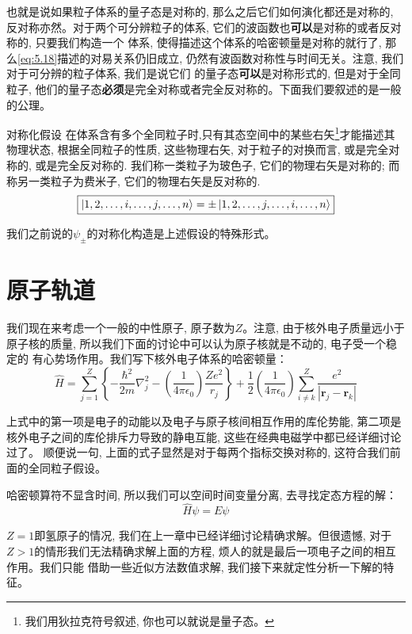 \documentclass[a4paper,zihao=-4,linespread=1]{ctexrep}
\begin{document}
    也就是说如果粒子体系的量子态是对称的, 那么之后它们如何演化都还是对称的, 反对称亦然。对于两个可分辨粒子的体系, 它们的波函数也\textbf{可以}是对称的或者反对称的, 只要我们构造一个
    体系, 使得描述这个体系的哈密顿量是对称的就行了, 那么\ref{eq:5.18}描述的对易关系仍旧成立, 仍然有波函数对称性与时间无关。注意, 我们对于可分辨的粒子体系, 我们是说它们
    的量子态\textbf{可以}是对称形式的, 但是对于全同粒子, 他们的量子态\textbf{必须}是完全对称或者完全反对称的。下面我们要叙述的是一般的公理。
    \begin{proposition}{对称化假设}
        在体系含有多个全同粒子时,只有其态空间中的某些右矢\footnote{我们用狄拉克符号叙述, 你也可以就说是量子态。}才能描述其物理状态, 根据全同粒子的性质, 这些物理右矢, 对于粒子的对换而言, 或是完全对称的, 或是完全反对称的. 我们称一类粒子为玻色子, 它们的物理右矢是对称的; 而称另一类粒子为费米子, 它们的物理右矢是反对称的.
        \begin{equation}
            \boxed{
                \ket{1,2,\ldots,i,\ldots,j,\ldots,n}=\pm\ket{1,2,\ldots,j,\ldots,i,\ldots,n}
            }
        \end{equation}
    \end{proposition}
    我们之前说的$\psi_\pm$的对称化构造是上述假设的特殊形式。

    \section{原子轨道}
    我们现在来考虑一个一般的中性原子, 原子数为$Z$。注意, 由于核外电子质量远小于原子核的质量, 所以我们下面的讨论中可以认为原子核就是不动的, 电子受一个稳定的
    有心势场作用。我们写下核外电子体系的哈密顿量：
    \begin{equation}
        \hat{H}=\sum_{j=1}^{Z}\left\{-\frac{\hbar^{2}}{2 m} \nabla_{j}^{2}-\left(\frac{1}{4 \pi \epsilon_{0}}\right) \frac{Z e^{2}}{r_{j}}\right\}+\frac{1}{2}\left(\frac{1}{4 \pi \epsilon_{0}}\right) \sum_{i \neq k}^{Z} \frac{e^{2}}{\left|\mathbf{r}_{j}-\mathbf{r}_{k}\right|}
    \end{equation}

    上式中的第一项是电子的动能以及电子与原子核间相互作用的库伦势能, 第二项是核外电子之间的库伦排斥力导致的静电互能, 这些在经典电磁学中都已经详细讨论过了。
    顺便说一句, 上面的式子显然是对于每两个指标交换对称的, 这符合我们前面的全同粒子假设。

    哈密顿算符不显含时间, 所以我们可以空间时间变量分离, 去寻找定态方程的解：
    \[\hat{H}\psi=E\psi\]

    $Z=1$即氢原子的情况, 我们在上一章中已经详细讨论精确求解。但很遗憾, 对于$Z>1$的情形我们无法精确求解上面的方程, 烦人的就是最后一项电子之间的相互作用。我们只能
    借助一些近似方法数值求解, 我们接下来就定性分析一下解的特征。
\end{document}
